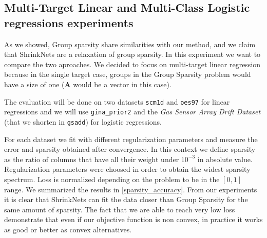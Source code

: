 \subsection{Multi-Target Linear and Multi-Class Logistic regressions experiments}
As we showed, Group sparsity share similarities with our method, and we claim
that ShrinkNets are a relaxation of group sparsity.  In this experiment we want
to compare the two aproaches.  We decided to focus on multi-target linear
regression because in the single target case, groups in the Group Sparsity
problem would have a size of one ($\bm{A}$ would be a vector in this case).

The evaluation will be done on two datasets \texttt{scm1d} and \texttt{oes97}
\cite{Spyromitros-Xioufis2016} for linear regressions and we will use \texttt{gina\_prior2} \cite{4371065} and
the \textit{Gas Sensor Array Drift Dataset} \cite{VERGARA2012320} (that we shorten in
\texttt{gsadd}) for logistic regressions.

For each dataset we fit with different regularization parameters and measure
the error and sparsity obtained after convergence. In this context we define
sparsity as the ratio of columns that have all their weight under $10^{-3}$ in
absolute value. Regularization parameters were choosed in order to obtain the
widest sparsity spectrum. Loss is normalized depending on the problem to be in
the $[0, 1]$ range. We summarized the results in \cref{sparsity_accuracy}. From
our experiments it is clear that ShrinkNets can fit the data closer than Group
Sparsity for the same amount of sparsity. The fact that we are able to reach
very low loss demonstrate that even if our objective function is non convex, in
practice it works as good or better as convex alternatives.
